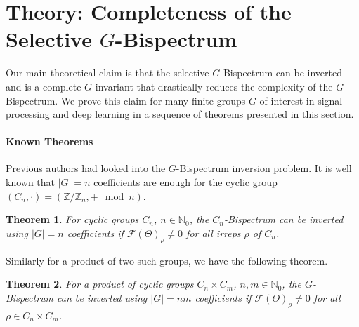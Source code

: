 \documentclass{article}
\theoremstyle{plain}
\newtheorem{theorem}{Theorem}[section]
\theoremstyle{definition}
\theoremstyle{remark}
\begin{document}
\section{Theory: Completeness of the Selective $G$-Bispectrum}\label{sec:completeness}

Our main theoretical claim is that the selective $G$-Bispectrum can be inverted and is a complete $G$-invariant that drastically reduces the complexity of the $G$-Bispectrum. We prove this claim for many finite groups $G$ of interest in signal processing and deep learning in a sequence of theorems presented in this section.


\paragraph{Known Theorems} Previous authors had looked into the $G$-Bispectrum inversion problem. It is well known that $|G|=n$ coefficients are enough for the cyclic group $(C_n, \cdot) = (\mathbb{Z} / \mathbb{Z}_n, +\mod n)$.

\begin{theorem}{\citep{kakarala_finite_groups}}\label{thm:cyclic_inversion}
For cyclic groups $C_n$, $n\in\mathbb{N}_0$, the $C_n$-Bispectrum can be inverted using $|G|=n$ coefficients if $\mathcal{F}(\Theta)_\rho\neq 0$ for all irreps $\rho$ of $C_n$.
\end{theorem}

Similarly for a product of two such groups, we have the following theorem.

\begin{theorem}{\citep{giannakis1989signal}}\label{thm:product_cyclic_inversion}
For a product of cyclic groups $C_n \times C_m$, $n,m\in\mathbb{N}_0$, the $G$-Bispectrum can be inverted using $|G|=n m$ coefficients if $\mathcal{F}(\Theta)_\rho\neq 0$ for all $\rho \in C_n \times C_m$.
\end{theorem}
\end{document}
